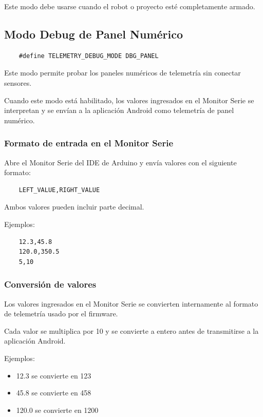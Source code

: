 Este modo debe usarse cuando el robot o proyecto esté completamente armado.

\subsection{Modo Debug de Panel Numérico}

\begin{verbatim}
    #define TELEMETRY_DEBUG_MODE DBG_PANEL
\end{verbatim}

Este modo permite probar los paneles numéricos de telemetría sin conectar sensores.

Cuando este modo está habilitado, los valores ingresados en el Monitor Serie se interpretan y se envían
a la aplicación Android como telemetría de panel numérico.

\subsubsection{Formato de entrada en el Monitor Serie}

Abre el Monitor Serie del IDE de Arduino y envía valores con el siguiente formato:

\begin{verbatim}
    LEFT_VALUE,RIGHT_VALUE
\end{verbatim}

Ambos valores pueden incluir parte decimal.

Ejemplos:

\begin{verbatim}
    12.3,45.8
    120.0,350.5
    5,10
\end{verbatim}

\subsubsection{Conversión de valores}

Los valores ingresados en el Monitor Serie se convierten internamente al formato de telemetría usado por el firmware.

Cada valor se multiplica por 10 y se convierte a entero antes de transmitirse a la aplicación Android.

Ejemplos:

\begin{itemize}
    \item 12.3 se convierte en 123
    \item 45.8 se convierte en 458
    \item 120.0 se convierte en 1200
\end{itemize}

